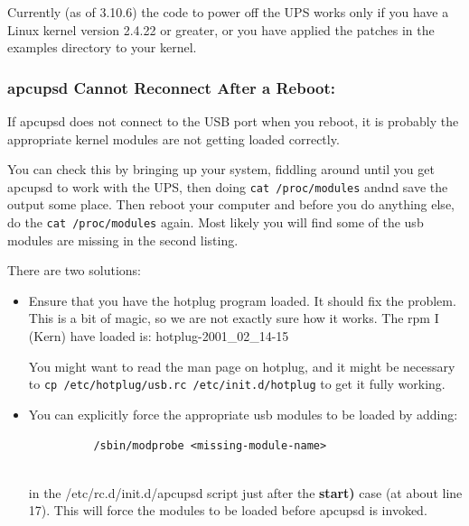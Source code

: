{{\label{index-Problems_002c-Power-off-106}
\label{index-Problems_002c-killpower-107}
Currently (as of 3.10.6) the code to power off the UPS works only if you have
a Linux kernel version 2.4.22 or greater, or you have applied the patches in
the examples directory to your kernel. 

\label{apcupsd-Cannot-Reconnect-After-a-Reboot}

\subsubsection*{apcupsd Cannot Reconnect After a Reboot:}

\label{index-Problems_002c-reconnect-108}
If apcupsd does not connect to the USB port when you reboot, it is probably
the appropriate kernel modules are not getting loaded correctly.  

You can check this by bringing up your system, fiddling around until you get
apcupsd to work with the UPS, then doing {\tt cat /proc/modules} andnd save
the output some place. Then reboot your computer and before you do anything
else, do the {\tt cat /proc/modules} again. Most likely you will find some of
the usb modules are missing in the second listing.  

There are two solutions:  

\begin{itemize}
\item Ensure that you have the hotplug program loaded. It should fix the
   problem. This is a bit of magic, so we are not exactly sure how it works. The
   rpm I (Kern) have loaded is: hotplug-2001\_02\_14-15  

You might want to read the man page on hotplug, and it might be necessary to
{\tt cp /etc/hotplug/usb.rc /etc/init.d/hotplug} to get it fully working.  
\item You can explicitly force the appropriate usb modules to be loaded by
   adding:  

\footnotesize
\begin{verbatim}
          /sbin/modprobe <missing-module-name>
     
\end{verbatim}
\normalsize

in the /etc/rc.d/init.d/apcupsd script just after the {\bf start)} case (at
about line 17). This will force the modules to be loaded before apcupsd is
invoked. 
\end{itemize}

\label{Monitoring-and-Tuning-your-UPS}

}}
